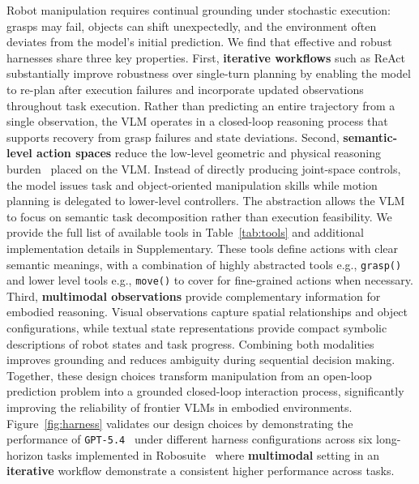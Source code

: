 Robot manipulation requires continual grounding under stochastic execution: grasps may fail, objects can shift unexpectedly, and the environment often deviates from the model's initial prediction.
We find that effective and robust harnesses share three key properties. First, \textbf{iterative workflows} such as ReAct~\citep{yao2023reactsynergizingreasoningacting} substantially improve robustness over single-turn planning by enabling the model to re-plan after execution failures and incorporate updated observations throughout task execution. Rather than predicting an entire trajectory from a single observation, the VLM operates in a closed-loop reasoning process that supports recovery from grasp failures and state deviations.
Second, \textbf{semantic-level action spaces} reduce the low-level geometric and physical reasoning burden~\citep{tong2024cambrian1fullyopenvisioncentric, guan2024hallusionbenchadvanceddiagnosticsuite} placed on the VLM. Instead of directly producing joint-space controls, the model issues task and object-oriented manipulation skills while motion planning is delegated to lower-level controllers. The abstraction allows the VLM to focus on semantic task decomposition rather than execution feasibility.
We provide the full list of available tools in Table~\ref{tab:tools} and additional implementation details in Supplementary. 
These tools define actions with clear semantic meanings, with a combination of highly abstracted tools e.g., \texttt{grasp()} and lower level tools e.g., \texttt{move()} to cover for fine-grained actions when necessary.
Third, \textbf{multimodal observations} provide complementary information for embodied reasoning. Visual observations capture spatial relationships and object configurations, while textual state representations provide compact symbolic descriptions of robot states and task progress. Combining both modalities improves grounding and reduces ambiguity during sequential decision making.
Together, these design choices transform manipulation from an open-loop prediction problem into a grounded closed-loop interaction process, significantly improving the reliability of frontier VLMs in embodied environments.
Figure~\ref{fig:harness} validates our design choices by demonstrating the performance of \texttt{GPT-5.4}~\citep{openai2026gpt54} under different harness configurations across six long-horizon tasks implemented in Robosuite~\citep{robosuite2020} where \textbf{multimodal} setting in an \textbf{iterative} workflow demonstrate a consistent higher performance across tasks.

